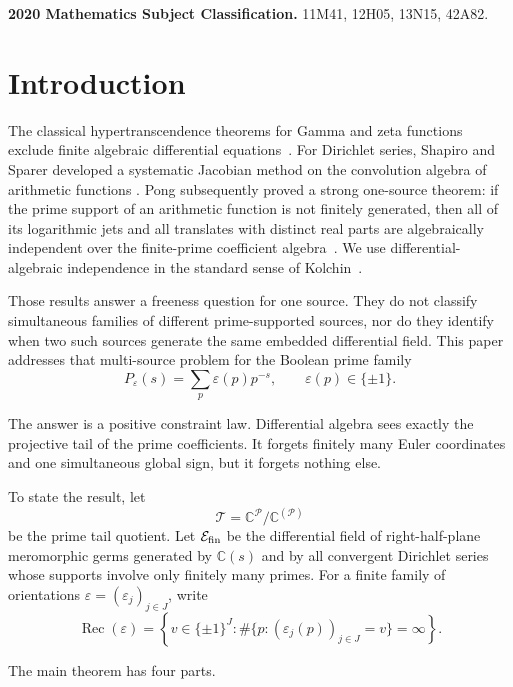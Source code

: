 \documentclass[11pt]{article}
\theoremstyle{definition}
\theoremstyle{remark}
\newcommand{\C}{\mathbb C}
\newcommand{\cP}{\mathcal P}
\newcommand{\cT}{\mathcal T}
\newcommand{\cE}{\mathcal E}
\begin{document}
\medskip
\noindent\textbf{2020 Mathematics Subject Classification.}
11M41, 12H05, 13N15, 42A82.

\section{Introduction}

The classical hypertranscendence theorems for Gamma and zeta functions exclude finite algebraic
differential equations~\cite{Holder1887,Ostrowski1920}.  For Dirichlet series, Shapiro and Sparer
developed a systematic Jacobian method on the convolution algebra of arithmetic functions
\cite{ShapiroSparer1986}.  Pong subsequently proved a strong one-source theorem: if the prime
support of an arithmetic function is not finitely generated, then all of its logarithmic jets and
all translates with distinct real parts are algebraically independent over the finite-prime
coefficient algebra~\cite[Theorem~5.9]{Pong2016}.
We use differential-algebraic independence in the standard sense of Kolchin~\cite{Kolchin}.

Those results answer a freeness question for one source.  They do not classify simultaneous
families of different prime-supported sources, nor do they identify when two such sources generate
the same embedded differential field.  This paper addresses that multi-source problem for the
Boolean prime family
\begin{equation}\label{eq:intro-carrier}
  P_\varepsilon(s)=\sum_p\varepsilon(p)p^{-s},
  \qquad \varepsilon(p)\in\{\pm1\}.
\end{equation}

The answer is a positive constraint law.  Differential algebra sees exactly the projective tail
of the prime coefficients.  It forgets finitely many Euler coordinates and one simultaneous
global sign, but it forgets nothing else.

To state the result, let
\[
  \cT=\C^{\cP}/\C^{(\cP)}
\]
be the prime tail quotient.  Let \(\cE_{\rm fin}\) be the differential field of right-half-plane
meromorphic germs generated by \(\C(s)\) and by all convergent Dirichlet series whose supports
involve only finitely many primes.  For a finite family of orientations
\(\varepsilon=(\varepsilon_j)_{j\in J}\), write
\[
  \operatorname{Rec}(\varepsilon)
  =\left\{v\in\{\pm1\}^{J}:
       \#\{p:(\varepsilon_j(p))_{j\in J}=v\}=\infty\right\}.
\]

The main theorem has four parts.
\end{document}
